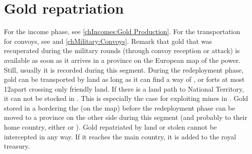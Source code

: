 \section{Gold repatriation}\label{chRedep:Gold Repatriation}

 For the income phase, see \ref{chIncomes:Gold
  Production}.
\bparag For the transportation for convoys, see
 and \ref{chMilitary:Convoys}.
\bparag Remark that gold that was recuperated during the military rounds
(through convoy reception or attack) is available as soon as it arrives in a
province on the European map of the power. Still, usually it is recorded
during this segment.
\label{chRedep:Gold Transportation} During the
redeployment phase, gold can be transported by land as long as it can find a
way of \TP, \COL or forts at most 12\MP apart crossing only friendly land. If
there is a land path to National Territory, it can not be stocked in \ROTW.
\bparag This is especially the case for \RUS exploiting mines in
.
\bparag Gold stored in a \COL bordering the  (on the \ROTW
map) before the redeployment phase can be moved to a province on the other
side during this segment (and probably to their home country, either \POL or
\TUR).
\bparag Gold repatriated by land or stolen cannot be intercepted in any
way. If it reaches the main country, it is added to the royal treasury.



